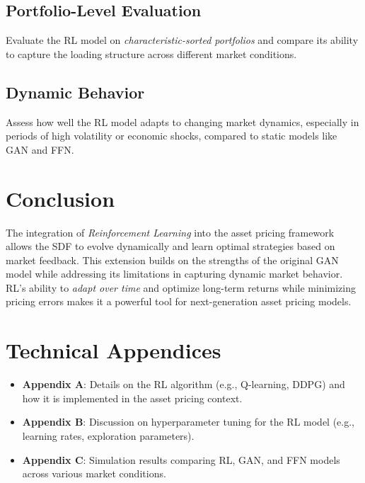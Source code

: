\subsection{Portfolio-Level Evaluation}
Evaluate the RL model on \textit{characteristic-sorted portfolios} and compare its ability to capture the loading structure across different market conditions.

\subsection{Dynamic Behavior}
Assess how well the RL model adapts to changing market dynamics, especially in periods of high volatility or economic shocks, compared to static models like GAN and FFN.

\section{Conclusion}
The integration of \textit{Reinforcement Learning} into the asset pricing framework allows the SDF to evolve dynamically and learn optimal strategies based on market feedback. This extension builds on the strengths of the original GAN model while addressing its limitations in capturing dynamic market behavior. RL's ability to \textit{adapt over time} and optimize long-term returns while minimizing pricing errors makes it a powerful tool for next-generation asset pricing models.

\section{Technical Appendices}
\begin{itemize}
    \item \textbf{Appendix A}: Details on the RL algorithm (e.g., Q-learning, DDPG) and how it is implemented in the asset pricing context.
    \item \textbf{Appendix B}: Discussion on hyperparameter tuning for the RL model (e.g., learning rates, exploration parameters).
    \item \textbf{Appendix C}: Simulation results comparing RL, GAN, and FFN models across various market conditions.
\end{itemize}
